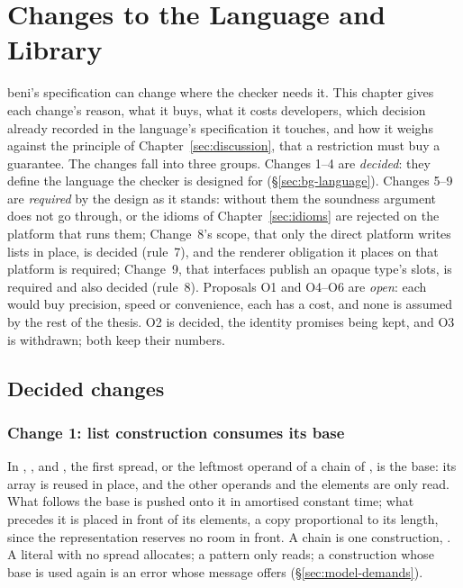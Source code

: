\chapter{Changes to the Language and Library}
\label{sec:disc-options}

beni's specification can change where the checker needs it. This chapter gives each change's reason,
what it buys, what it costs developers, which decision already recorded in the language's specification
it touches, and how it weighs against the principle of Chapter~\ref{sec:discussion}, that a restriction
must buy a guarantee. The changes fall into three groups. Changes 1--4 are \emph{decided}: they define the
language the checker is designed for (\S\ref{sec:bg-language}). Changes 5--9 are \emph{required} by the
design as it stands: without them the soundness argument does not go through, or the idioms of
Chapter~\ref{sec:idioms} are rejected on the platform that runs them; Change~8's scope, that only the direct
platform writes lists in place, is decided (rule~7), and the renderer obligation it places on that platform is
required; Change~9, that interfaces publish an opaque type's slots, is required and also decided
(rule~8). Proposals O1 and O4--O6 are \emph{open}: each would buy precision, speed or convenience, each
has a cost, and none is assumed by the rest of the thesis. O2 is decided, the identity promises being
kept, and O3 is withdrawn; both keep their numbers.

\section{Decided changes}

\subsection*{Change 1: list construction consumes its base}

In \code{[ …acc, x ]}, \code{[ …acc, …ys ]},  and \code{[ x, …acc ]}, the first spread, or
the leftmost operand of a chain of \code{++}, is the base: its array is reused in place, and the other
operands and the elements are only read. What follows the base is pushed onto it in amortised constant
time; what precedes it is placed in front of its elements, a copy proportional to its length, since the
representation reserves no room in front. A chain  is one construction,
\code{[ …a, …b, …c ]}. A literal with no spread allocates; a pattern only reads; a construction whose base
is used again is an error whose message offers  (\S\ref{sec:model-demands}).

